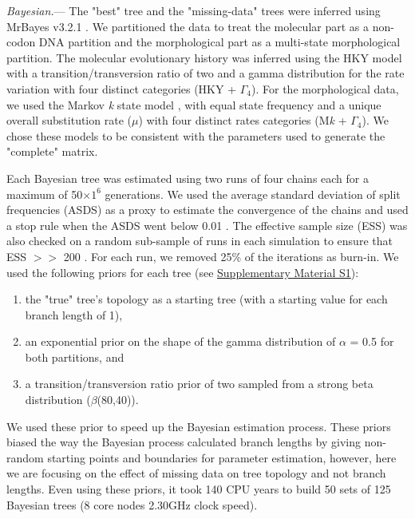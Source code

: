 \documentclass[12pt,letterpaper]{article}
\renewcommand{\subsubsection}[1]{%
\vspace{2ex}
\noindent
\textit{#1.}---}
\begin{document}
\subsubsection{Bayesian}
The "best" tree and the "missing-data" trees were inferred using MrBayes v3.2.1 \citep{Ronquist2012mrbayes}. We partitioned the data to treat the molecular part as a non-codon DNA partition and the morphological part as a multi-state morphological partition. The molecular evolutionary history was inferred using the HKY model with a transition/transversion ratio of two \citep{douadycomparison2003} and a gamma distribution for the rate variation with four distinct categories (HKY + $\Gamma_4$). For the morphological data, we used the Markov \textit{k} state model \citep{lewisa2001}, with equal state frequency and a unique overall substitution rate ($\mu$) with four distinct rates categories (M\textit{k} + $\Gamma_4$). We chose these models to be consistent with the parameters used to generate the "complete" matrix.

Each Bayesian tree was estimated using two runs of four chains each for a maximum of 50$\times$$1^6$ generations. We used the average standard deviation of split frequencies (ASDS) as a proxy to estimate the convergence of the chains and used a stop rule when the ASDS went below 0.01 \citep{Ronquist2012mrbayes}. The effective sample size (ESS) was also checked on a random sub-sample of runs in each simulation to ensure that ESS $>>$ 200 \citep{drummond2006ess}. For each run, we removed 25\% of the iterations as burn-in. We used the following priors for each tree (see \hyperref[SupplementaryMaterial]{Supplementary Material S1}):
\begin{enumerate}
\item the "true" tree’s topology as a starting tree (with a starting value for each branch length of 1),
\item an exponential prior on the shape of the gamma distribution of $\alpha$ = 0.5 for both partitions, and
\item a transition/transversion ratio prior of two sampled from a strong beta distribution ($\beta$(80,40)).
\end{enumerate}

We used these prior to speed up the Bayesian estimation process. These priors biased the way the Bayesian process calculated branch lengths by giving non-random starting points and boundaries for parameter estimation, however, here we are focusing on the effect of missing data on tree topology and not branch lengths. Even using these priors, it took 140 CPU years to build 50 sets of 125 Bayesian trees (8 core nodes 2.30GHz clock speed).
\end{document}
